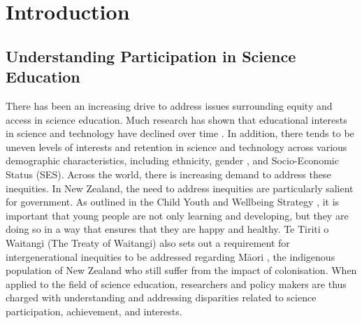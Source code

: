 \chapter{Introduction}

\section{Understanding Participation in Science Education}
There has been an increasing drive to address issues surrounding equity and access in science education. Much research has shown that educational interests in science and technology have declined over time \citep{OECD2006}. In addition, there tends to be uneven levels of interests and retention in science and technology across various demographic characteristics, including ethnicity, gender \citep{cheryan2017some,su2015all}, and Socio-Economic Status (SES). Across the world, there is increasing demand to address these inequities. In New Zealand, the need to address inequities are particularly salient for government. As outlined in the Child Youth and Wellbeing Strategy \citep{wellbeing2019}, it is important that young people are not only learning and developing, but they are doing so in a way that ensures that they are happy and healthy. Te Tiriti o Waitangi (The Treaty of Waitangi) also sets out a requirement for intergenerational inequities to be addressed regarding M\={a}ori \citep{treatywaitangi}, the indigenous population of New Zealand who still suffer from the impact of colonisation. When applied to the field of science education, researchers and policy makers are thus charged with understanding and addressing disparities related to science participation, achievement, and interests. 

